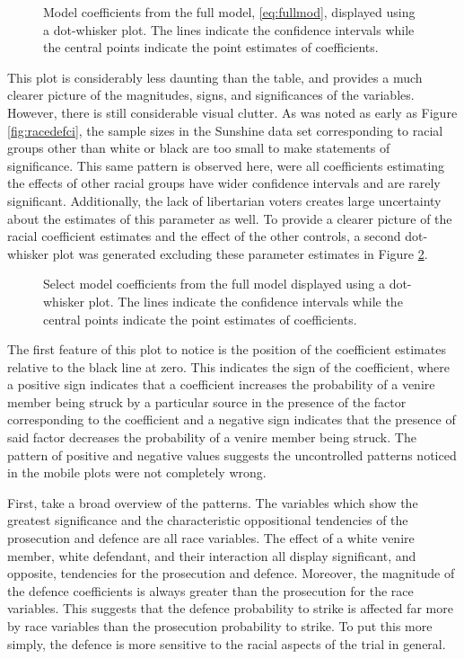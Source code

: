 \begin{figure}[h!]
  \centering
  \caption[All Model Coefficients]{\footnotesize Model coefficients from the full model, \ref{eq:fullmod}, displayed using
    a dot-whisker plot. The lines indicate the confidence intervals while the central points indicate the point estimates of
    coefficients.}
  \label{fig:modallcoef}
\end{figure}

This plot is considerably less daunting than the table, and provides a much clearer picture of the magnitudes, signs, and
significances of the variables. However, there is still considerable visual clutter. As was noted as early as Figure
\ref{fig:racedefci}, the sample sizes in the Sunshine data set corresponding to racial groups other than white or black are too
small to make statements of significance. This same pattern is observed here, were all coefficients estimating the effects of
other racial groups have wider confidence intervals and are rarely significant. Additionally, the lack of libertarian voters
creates large uncertainty about the estimates of this parameter as well. To provide a clearer picture of the racial coefficient
estimates and the effect of the other controls, a second dot-whisker plot was generated excluding these parameter estimates in
Figure \ref{fig:modselcoef}.

\begin{figure}[h!]
  \centering
  \caption[Select Model Coefficients]{\footnotesize Select model coefficients from the full model displayed using a dot-whisker
    plot. The lines indicate the confidence intervals while the central points indicate the point estimates of coefficients.}
  \label{fig:modselcoef}
\end{figure}

The first feature of this plot to notice is the position of the coefficient estimates relative to the black line at zero. This
indicates the sign of the coefficient, where a positive sign indicates that a coefficient increases the probability of a venire
member being struck by a particular source in the presence of the factor corresponding to the coefficient and a negative sign
indicates that the presence of said factor decreases the probability of a venire member being struck. The pattern of positive and
negative values suggests the uncontrolled patterns noticed in the mobile plots were not completely wrong.

First, take a broad overview of the patterns. The variables which show the greatest significance and the characteristic
oppositional tendencies of the prosecution and defence are all race variables. The effect of a white venire member, white
defendant, and their interaction all display significant, and opposite, tendencies for the prosecution and defence. Moreover, the
magnitude of the defence coefficients is always greater than the prosecution for the race variables. This suggests that the
defence probability to strike is affected far more by race variables than the prosecution probability to strike. To put this more
simply, the defence is more sensitive to the racial aspects of the trial in general.

